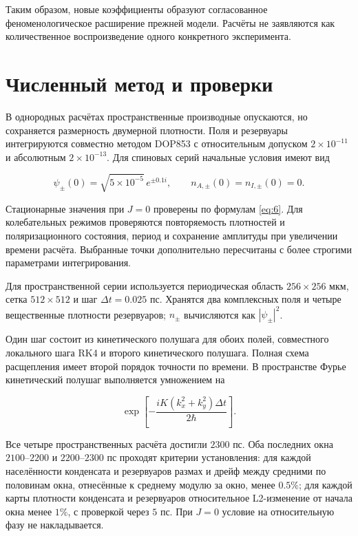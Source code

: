 \documentclass[12pt,a4paper]{article}
\begin{document}
Таким образом, новые коэффициенты образуют согласованное феноменологическое расширение прежней модели. Расчёты не заявляются как количественное воспроизведение одного конкретного эксперимента.

\clearpage
\section{Численный метод и проверки}\label{sec:B}

В однородных расчётах пространственные производные опускаются, но сохраняется размерность двумерной плотности. Поля и резервуары интегрируются совместно методом DOP853 с относительным допуском \(2\times10^{-11}\) и абсолютным \(2\times10^{-13}\). Для спиновых серий начальные условия имеют вид

\[
\psi_\pm(0)=\sqrt{5\times10^{-5}}\,e^{\pm0.1i},
\qquad n_{A,\pm}(0)=n_{I,\pm}(0)=0.
\]

Стационарные значения при \(J=0\) проверены по формулам \eqref{eq:6}. Для колебательных режимов проверяются повторяемость плотностей и поляризационного состояния, период и сохранение амплитуды при увеличении времени расчёта. Выбранные точки дополнительно пересчитаны с более строгими параметрами интегрирования.

Для пространственной серии используется периодическая область \(256\times256\) мкм, сетка \(512\times512\) и шаг \(\Delta t=0.025\) пс. Хранятся два комплексных поля и четыре вещественные плотности резервуаров; \(n_\pm\) вычисляются как \(|\psi_\pm|^2\).

Один шаг состоит из кинетического полушага для обоих полей, совместного локального шага RK4 и второго кинетического полушага. Полная схема расщепления имеет второй порядок точности по времени. В пространстве Фурье кинетический полушаг выполняется умножением на

\[
\exp\!\left[
-\frac{iK(k_x^2+k_y^2)\Delta t}{2\hbar}
\right].
\]

Все четыре пространственных расчёта достигли \(2300\) пс. Оба последних окна \(2100\)--\(2200\) и \(2200\)--\(2300\) пс проходят критерии установления: для каждой населённости конденсата и резервуаров размах и дрейф между средними по половинам окна, отнесённые к среднему модулю за окно, менее \(0.5\%\); для каждой карты плотности конденсата и резервуаров относительное L2-изменение от начала окна менее \(1\%\), с проверкой через \(5\) пс. При \(J=0\) условие на относительную фазу не накладывается.
\end{document}
